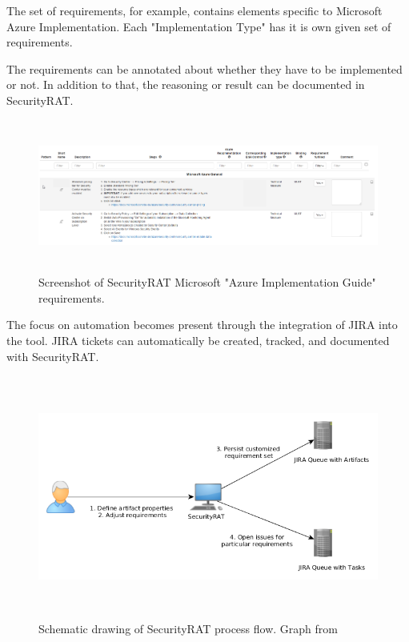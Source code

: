 The set of requirements, for example, contains elements specific to Microsoft Azure Implementation. Each "Implementation Type" has it is own given set of requirements.

\newpage

The requirements can be annotated about whether they have to be implemented or not. In addition to that, the reasoning or result can be documented in SecurityRAT.

\begin{figure}[ht!]
\begin{center}
\includegraphics[height=5cm]{secrat_screen.png}
\end{center}
\caption[Screenshot of SecurityRat]{Screenshot of SecurityRAT Microsoft "Azure Implementation Guide" requirements.}
\label{fig_devsecops}
\end{figure}

The focus on automation becomes present through the integration of JIRA into the tool. JIRA tickets can automatically be created, tracked, and documented with SecurityRAT.

\begin{figure}[ht!]
\begin{center}
\includegraphics[height=8cm]{security_rat.png}
\end{center}
\caption[SecurityRat Schema]{Schematic drawing of SecurityRAT process flow. Graph from \citep{secrat2020}}
\label{fig_devsecops}
\end{figure}

